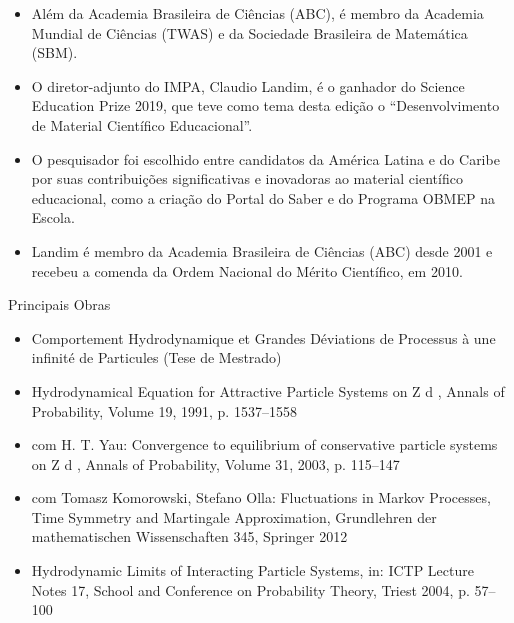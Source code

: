 \documentclass{beamer}
\begin{document}
\begin{frame}{}
    \begin{block}{}
        \begin{itemize}
            \item Além da Academia Brasileira de Ciências (ABC), é membro da Academia Mundial de Ciências (TWAS) e da Sociedade Brasileira de Matemática (SBM).
            \item O diretor-adjunto do IMPA, Claudio Landim, é o ganhador do Science Education Prize 2019, que teve como tema desta edição o “Desenvolvimento de Material Científico Educacional”. 
            \item O pesquisador foi escolhido entre candidatos da América Latina e do Caribe por suas contribuições significativas e inovadoras ao material científico educacional, como a criação do Portal do Saber e do Programa OBMEP na Escola. 
            \item Landim é membro da Academia Brasileira de Ciências (ABC) desde 2001 e recebeu  a comenda da Ordem Nacional do Mérito Científico, em 2010.
        \end{itemize}
    \end{block}  
\end{frame}


\begin{frame}{}
    \begin{block}{Principais Obras}
        \begin{itemize}
            \item Comportement Hydrodynamique et Grandes Déviations de Processus à une infinité de Particules (Tese de Mestrado)
            \item Hydrodynamical Equation for Attractive Particle Systems on Z d , Annals of Probability, Volume 19, 1991, p. 1537–1558
            \item com H. T. Yau: Convergence to equilibrium of conservative particle systems on Z d , Annals of Probability, Volume 31, 2003, p. 115–147
            \item com Tomasz Komorowski, Stefano Olla: Fluctuations in Markov Processes, Time Symmetry and Martingale Approximation, Grundlehren der mathematischen Wissenschaften 345, Springer 2012
            \item Hydrodynamic Limits of Interacting Particle Systems, in: ICTP Lecture Notes 17, School and Conference on Probability Theory, Triest 2004, p. 57–100
        \end{itemize}
    \end{block}
\end{frame}
\end{document}
